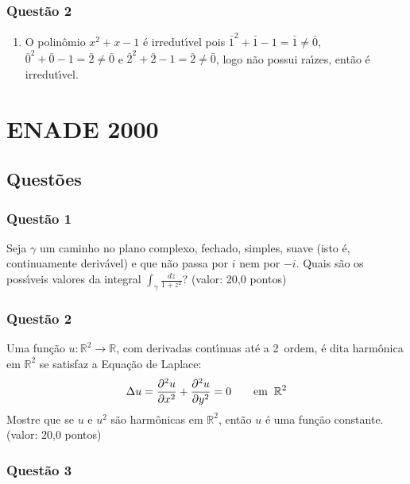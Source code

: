 \documentclass{report}
\begin{document}
\subsection{\color{red} Quest\~ao 2}

\begin{enumerate}

\item[(a)] O polinômio $x^2+x-1$ \'e irredut\'\i vel pois $\bar 1^2+\bar 1 -1=\bar 1 \neq \bar 0$, $\bar 0^2+\bar 0-1=\bar 2\neq \bar 0$ e $\bar 2^2+\bar 2-1=\bar 2 \neq \bar 0$, logo n\~ao possui ra\'\i zes, ent\~ao \'e irredut\'\i vel.

\end{enumerate}

\chapter{ENADE 2000}

\section{\color{blue} Quest\~oes}

\subsection{\color{blue} Quest\~ao 1}

Seja $\gamma$ um caminho no plano complexo, fechado, simples, suave (isto \'e, continuamente deriv\'avel) e que n\~ao passa por $i$ nem por $-i$. Quais s\~ao os poss\'\i veis valores da integral $\displaystyle \int_\gamma \frac{dz}{1+z^2}$? (valor: 20,0 pontos)

\subsection{\color{blue} Quest\~ao 2}

Uma fun\c c\~ao $u: \mathbb R^2 \to \mathbb R$, com derivadas cont\'\i nuas at\'e a 2\textordfeminine\ ordem, \'e dita harmônica em $\mathbb R^2$ se satisfaz a Equa\c c\~ao de Laplace: $$\Delta u={\partial^2u\over\partial x^2}+{\partial^2u\over\partial y^2}=0 \qquad \rm{em}\;\; \mathbb R^2$$ Mostre que se $u$ e $u^2$ s\~ao harmônicas em $\mathbb R^2$, ent\~ao $u$ \'e uma fun\c c\~ao constante. (valor: 20,0 pontos)

\subsection{\color{blue} Quest\~ao 3}
\end{document}
